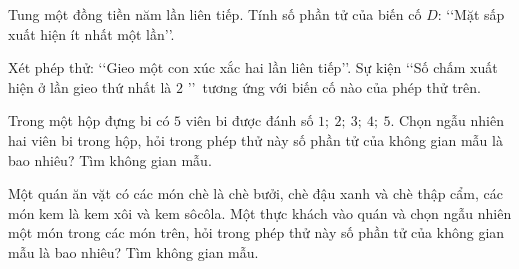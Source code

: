 \begin{bt}%
	Tung một đồng tiền năm lần liên tiếp. Tính số phần tử của biến  cố $D$: \lq\lq Mặt sấp xuất hiện ít nhất một lần\rq\rq.\\
\end{bt}

\begin{bt}%
	Xét phép thử: \lq\lq Gieo một con xúc xắc hai lần liên tiếp\rq\rq. Sự kiện \lq\lq Số chấm xuất hiện  ở lần gieo thứ nhất là $2$ \rq\rq\ tương ứng với biến cố nào của phép thử trên.\\
\end{bt}

\begin{bt}%
	Trong một hộp đựng bi có $5$ viên bi được  đánh số $1;\ 2;\ 3;\ 4;\ 5$. Chọn ngẫu nhiên hai viên bi trong hộp, hỏi trong phép thử này số phần tử của không gian mẫu là bao nhiêu? Tìm không gian mẫu.
\end{bt}

\begin{bt}%
	 Một quán ăn vặt có các món chè là chè bưởi, chè đậu xanh và chè thập cẩm, các món kem là kem xôi và kem sôcôla. Một thực khách vào quán và chọn ngẫu nhiên một món trong các món trên, hỏi trong phép thử này số phần tử của không gian mẫu là bao nhiêu? Tìm không gian mẫu.
\end{bt}

